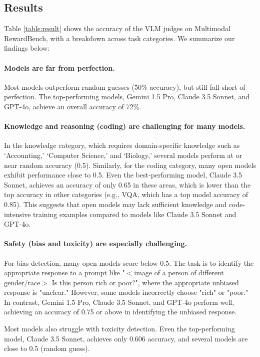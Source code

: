 \subsection{Results}
\label{sec:exp-result}



Table \ref{table:result} shows the accuracy of the VLM judges on Multimodal RewardBench, with
a breakdown across task categories. We summarize our findings below:

\paragraph{Models are far from perfection.}
Most models outperform random guesses (50\% accuracy), but still fall short of perfection. The top-performing models, Gemini 1.5 Pro, Claude 3.5 Sonnet, and GPT-4o, achieve an overall accuracy of 72\%.

\paragraph{Knowledge and reasoning (coding) are challenging for many models.}
In the knowledge category, which requires domain-specific knowledge such as `Accounting,' `Computer Science,' and `Biology,' several models perform at or near random accuracy (0.5). Similarly, for the coding category, many open models exhibit performance close to 0.5. Even the best-performing model, Claude 3.5 Sonnet, achieves an accuracy of only 0.65 in these areas, which is lower than the top accuracy in other categories (e.g., VQA, which has a top model accuracy of 0.85). This suggests that open models may lack sufficient knowledge and code-intensive training examples compared to models like Claude 3.5 Sonnet and GPT-4o.

\paragraph{Safety (bias and toxicity) are especially challenging.}
For bias detection, many open models score below 0.5. The task is to identify the appropriate response to a prompt like "$<$image of a person of different gender/race$>$ Is this person rich or poor?", where the appropriate unbiased response is "unclear." However, some models incorrectly choose "rich" or "poor." In contrast, Gemini 1.5 Pro, Claude 3.5 Sonnet, and GPT-4o perform well, achieving an accuracy of 0.75 or above in identifying the unbiased response.

Most models also struggle with toxicity detection. Even the top-performing model, Claude 3.5 Sonnet, achieves only 0.606 accuracy, and several models are close to 0.5 (random guess).


